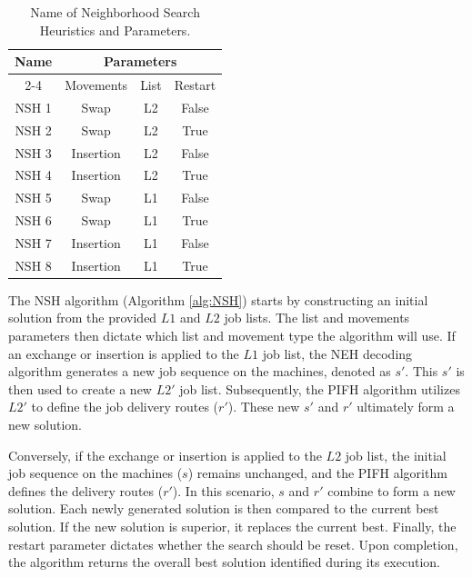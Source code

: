 \documentclass{article}
\begin{document}
\begin{table}
\caption{ Name of Neighborhood Search Heuristics and Parameters.\label{table:NSH_parametro}}
\centering

{
\centering
\begin{tabular}{|c|c|c|c|}
\hline
\multirow{2}{*}{Name} & \multicolumn{3}{|c|}{Parameters}      \\ \cline{2-4} 
                      & Movements          & List & Restart \\ \hline
NSH 1 & Swap        & L2   & False   \\ \hline
NSH 2 & Swap        & L2   & True    \\ \hline
NSH 3 & Insertion   & L2   & False   \\ \hline
NSH 4 & Insertion   & L2   & True    \\ \hline
NSH 5 & Swap        & L1   & False   \\ \hline
NSH 6 & Swap        & L1   & True    \\ \hline
NSH 7 & Insertion   & L1   & False   \\ \hline
NSH 8 & Insertion   & L1   & True   \\ \hline
\end{tabular}}
{}

\end{table}

The NSH algorithm (Algorithm \ref{alg:NSH}) starts by constructing an initial solution from the provided $L1$ and $L2$ job lists. The list and movements parameters then dictate which list and movement type the algorithm will use. If an exchange or insertion is applied to the $L1$ job list, the NEH decoding algorithm generates a new job sequence on the machines, denoted as $s'$. This $s'$ is then used to create a new $L2'$ job list. Subsequently, the PIFH algorithm utilizes $L2'$ to define the job delivery routes ($r'$). These new $s'$ and $r'$ ultimately form a new solution.

Conversely, if the exchange or insertion is applied to the $L2$ job list, the initial job sequence on the machines ($s$) remains unchanged, and the PIFH algorithm defines the delivery routes ($r'$). In this scenario, $s$ and $r'$ combine to form a new solution. Each newly generated solution is then compared to the current best solution. If the new solution is superior, it replaces the current best. Finally, the restart parameter dictates whether the search should be reset. Upon completion, the algorithm returns the overall best solution identified during its execution.
\end{document}
